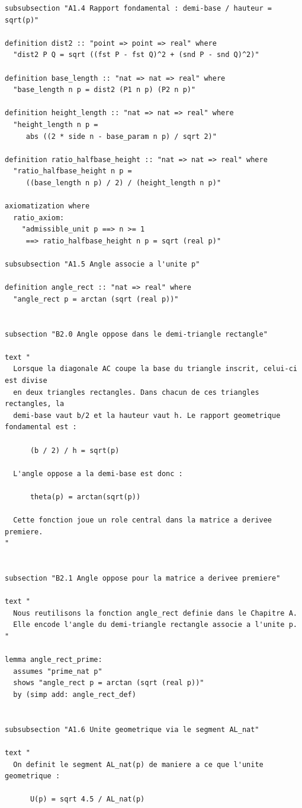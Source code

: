 \documentclass[12pt,a4paper]{article}
\theoremstyle{definition}
\theoremstyle{remark}
\begin{document}
\begin{verbatim}
subsubsection "A1.4 Rapport fondamental : demi-base / hauteur = sqrt(p)"

definition dist2 :: "point => point => real" where
  "dist2 P Q = sqrt ((fst P - fst Q)^2 + (snd P - snd Q)^2)"

definition base_length :: "nat => nat => real" where
  "base_length n p = dist2 (P1 n p) (P2 n p)"

definition height_length :: "nat => nat => real" where
  "height_length n p =
     abs ((2 * side n - base_param n p) / sqrt 2)"

definition ratio_halfbase_height :: "nat => nat => real" where
  "ratio_halfbase_height n p =
     ((base_length n p) / 2) / (height_length n p)"

axiomatization where
  ratio_axiom:
    "admissible_unit p ==> n >= 1
     ==> ratio_halfbase_height n p = sqrt (real p)"

subsubsection "A1.5 Angle associe a l'unite p"

definition angle_rect :: "nat => real" where
  "angle_rect p = arctan (sqrt (real p))"


subsection "B2.0 Angle oppose dans le demi-triangle rectangle"

text "
  Lorsque la diagonale AC coupe la base du triangle inscrit, celui-ci est divise
  en deux triangles rectangles. Dans chacun de ces triangles rectangles, la
  demi-base vaut b/2 et la hauteur vaut h. Le rapport geometrique fondamental est :

      (b / 2) / h = sqrt(p)

  L'angle oppose a la demi-base est donc :

      theta(p) = arctan(sqrt(p))

  Cette fonction joue un role central dans la matrice a derivee premiere.
"


subsection "B2.1 Angle oppose pour la matrice a derivee premiere"

text "
  Nous reutilisons la fonction angle_rect definie dans le Chapitre A.
  Elle encode l'angle du demi-triangle rectangle associe a l'unite p.
"

lemma angle_rect_prime:
  assumes "prime_nat p"
  shows "angle_rect p = arctan (sqrt (real p))"
  by (simp add: angle_rect_def)


subsubsection "A1.6 Unite geometrique via le segment AL_nat"

text "
  On definit le segment AL_nat(p) de maniere a ce que l'unite geometrique :

      U(p) = sqrt 4.5 / AL_nat(p)


\end{verbatim}
\end{document}
